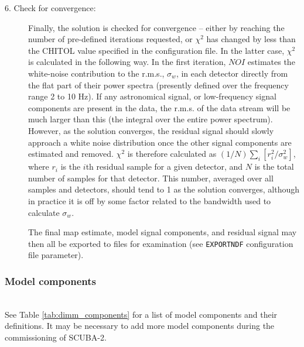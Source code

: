 \documentclass[twoside,11pt]{article}
\renewcommand{\_}{\texttt{\symbol{95}}}
\newcommand{\cparam}[1]{\texttt{#1}}     %
\begin{document}
\begin{description}
\item[6. Check for convergence:] Finally, the solution is checked for
  convergence -- either by reaching the number of pre-defined
  iterations requested, or $\chi^2$ has changed by less than the
  CHITOL value specified in the configuration file. In the latter
  case, $\chi^2$ is calculated in the following way. In the first
  iteration, $NOI$ estimates the white-noise contribution to the
  r.m.s., $\sigma_w$, in each detector directly from the flat part of
  their power spectra (presently defined over the frequency range 2 to
  10 Hz). If any astronomical signal, or low-frequency signal
  components are present in the data, the r.m.s. of the data stream
  will be much larger than this (the integral over the entire power
  spectrum). However, as the solution converges, the residual signal
  should slowly approach a white noise distribution once the other
  signal components are estimated and removed. $\chi^2$ is therefore
  calculated as $(1/N) \sum_i[ r_i^2/\sigma^2_w]$, where $r_i$ is the
  $i$th residual sample for a given detector, and $N$ is the total
  number of samples for that detector. This number, averaged over all
  samples and detectors, should tend to 1 as the solution converges,
  although in practice it is off by some factor related to the
  bandwidth used to calculate $\sigma_w$.

  The final map estimate, model signal components, and residual signal
  may then all be exported to files for examination (see
  \cparam{EXPORTNDF} configuration file parameter).

\end{description}

\subsubsection{Model components} \ \\

See Table \ref{tab:dimm_components} for a list of model components and
their definitions. It may be necessary to add more model components
during the commissioning of SCUBA-2.
\end{document}
